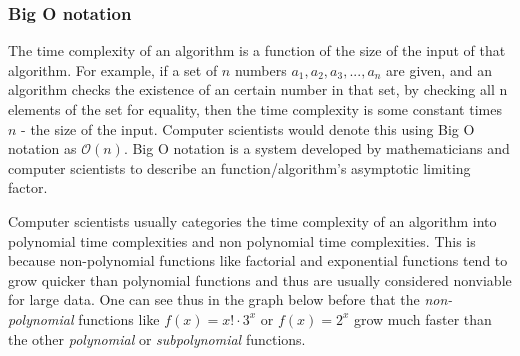 \documentclass[titlepage]{article}
\begin{document}
\subsubsection*{Big O notation}
The time complexity of an algorithm is a function of the size of the input of that algorithm. For example, if a set of $n$ numbers $a_1, a_2, a_3, ..., a_n$ are given, and an algorithm checks the existence of an certain number in that set, by checking all n elements of the set for equality, then the time complexity is some constant times $n$ - the size of the input. Computer scientists would denote this using Big O notation as $\mathcal{O}(n)$. Big O notation is a system developed by mathematicians and computer scientists to describe an function/algorithm's asymptotic limiting factor. \cite{bigO}

Computer scientists usually categories the time complexity of an algorithm into polynomial time complexities and non polynomial time complexities. This is because non-polynomial functions like factorial and exponential functions tend to grow quicker than polynomial functions and thus are usually considered nonviable for large data. One can see thus in the graph below before that the \textit{non-polynomial} functions like $f(x) = x!\cdot3^{x}$ or $f(x) = 2^{x}$ grow much faster than the other \textit{polynomial} or \textit{subpolynomial} functions. 

\vskip 1cm
\end{document}
